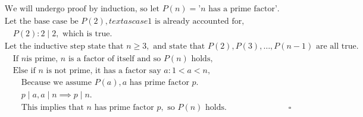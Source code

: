 \documentclass{article}
\begin{document}
                \begin{align*}
                    &\text{We will undergo proof by induction, so let }P(n) = \text{'} n\text{ has a prime factor'}.\\
                    &\text{Let the base case be } P(2), text{ as case } 1 \text{ is already accounted for},\\
                    &\quad P(2): 2\mid 2,\text{ which is true}.\\
                    &\text{Let the inductive step state that } n \geq 3,\text{ and state that } P(2), P(3), \dots, P(n-1)\text{ are all true}.\\
                    &\quad\text{If } n \text{is prime, }n\text{ is a factor of itself and so }P(n) \text{ holds},\\
                    &\quad\text{Else if } n \text{ is not prime, it has a factor say }a: 1 < a < n,\\
                    &\qquad\text{Because we assume }P(a), a\text{ has prime factor }p.\\
                    &\qquad p\mid a, a \mid n \implies p\mid n.\\
                    &\qquad\text{This implies that }n \text{ has prime factor }p,\text{ so }P(n) \text{ holds}. &\square\\
                \end{align*}
\end{document}
